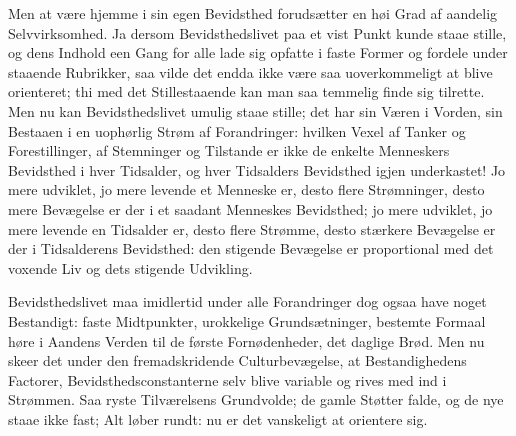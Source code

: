 \documentclass[12pt]{book}
\begin{document}
Men at være hjemme i sin egen Bevidsthed forudsætter en høi Grad af aandelig
Selvvirksomhed. Ja dersom Bevidsthedslivet paa et vist Punkt kunde staae stille,
og dens Indhold een Gang for alle lade sig opfatte i faste Former og fordele
under staaende Rubrikker, saa vilde det endda ikke være saa uoverkommeligt at
blive orienteret; thi med det Stillestaaende kan man saa temmelig finde sig
tilrette. Men nu kan Bevidsthedslivet umulig staae stille; det har sin Væren i
Vorden, sin Bestaaen i en uophørlig Strøm af Forandringer:
hvilken Vexel af Tanker og Forestillinger, af Stemninger og Tilstande er ikke de
enkelte Menneskers Bevidsthed i hver Tidsalder, og hver Tidsalders Bevidsthed
igjen underkastet! Jo mere udviklet, jo mere levende et Menneske er, desto flere
Strømninger, desto mere Bevægelse er der i et saadant Menneskes Bevidsthed; jo
mere udviklet, jo mere levende en Tidsalder er, desto flere Strømme, desto
stærkere Bevægelse er der i Tidsalderens Bevidsthed: den stigende Bevægelse er
proportional med det voxende Liv og dets stigende Udvikling.

Bevidsthedslivet maa imidlertid under alle Forandringer dog ogsaa have noget
Bestandigt: faste Midtpunkter, urokkelige Grundsætninger, bestemte Formaal høre
i Aandens Verden til de første Fornødenheder, det daglige Brød. Men nu skeer det
under den fremadskridende Culturbevægelse, at Bestandighedens Factorer,
Bevidsthedsconstanterne selv blive variable og rives med ind i Strømmen. Saa
ryste Tilværelsens Grundvolde; de gamle Støtter falde, og de nye staae ikke
fast; Alt løber rundt: nu er det vanskeligt at orientere sig.
\end{document}
